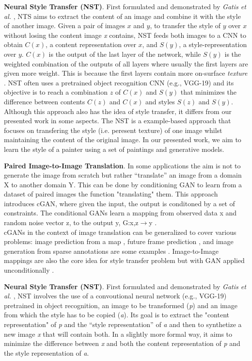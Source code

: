 \documentclass[10pt,twocolumn,letterpaper]{article}
\begin{document}
\textbf{Neural Style Transfer (NST)}. First formulated and demonstrated by \textit{Gatis et al.} \cite{NST}, NTS aims to extract the content of an image and combine it with the style of another image. Given a pair of images $x$ and $y$, to transfer the style of $y$ over $x$ without losing the content image \textit{x} contains, NST feeds both images to a CNN \cite{cnn} to obtain $C(x)$, a content representation over $x$, and $S(y)$, a style-representation over $y$. $C(x)$ is the output of the last layer of the network, while $S(y)$ is the weighted combination of the outputs of all layers where usually the first layers are given more weight. This is because the first layers contain more on-surface \textit{texture} \cite{texture}. NST often uses a pretrained object recognition CNN (e.g., VGG-19) and its objective is to reach a combination $z$ of $C(x)$ and $S(y)$ that minimizes the difference between contents $C(z)$ and $C(x)$ and styles $S(z)$ and $S(y)$. Although this approach also has the idea of style transfer, it differs from our presented work in some aspects. The NST is a example-based approach that focuses on transfering the style (i.e. peresent texture) of one image whilst maintaining the content of the original image. In our presented work, we aim to learn the style of a painter using a set of paintings and generative models. 


\textbf{Paired Image-to-Image Translation}. In some applications the aim is not to generate the image from scratch but rather “translate” an image from a domain X to another domain Y. This can be done by conditioning GAN to learn from a dataset of paired images the function "translating" them. This approach introduces cGAN, where given the input, the output is conditoned by a set of constraints. The conditional GANs learn a mapping from observed data x and random noise vector z, to the output y, G:{x,z}$\rightarrow$y \cite{imgtoimg}.\\
cGANs in the context of image translation can be generalized to cover various problems: image prediction from a map \cite{example1}, future frame prediction \cite{example2}, and image generation from sparse annotations are some examples \cite{example3}. Image-to-Image mappings are also the core idea for style transfer problem but with GAN applied unconditionally \cite{example4}.

\textbf{Neural Style Transfer (NST)}. First formulated and demonstrated by \textit{Gatis et al.} \cite{NST}, NST involves the use of a convoutional neural network (e.g., VGG-19) pretrained in object recognition, an image to be transformed (\textit{p}) and an image from which the style has to be copied (\textit{a}). Its goal is to extract the "content representation" of \textit{p} and the  “style representation” of \textit{a} and then to synthetize a new image \textit{x} that will contain both. In a slightly more formal way, it aims to minimize the difference between  \textit{x} and both the content representation of \textit{p} and the style representation of \textit{a}.
\end{document}
